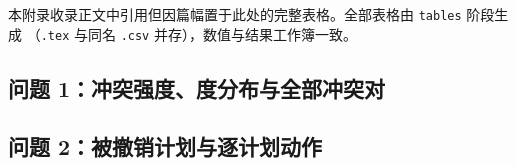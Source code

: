 本附录收录正文中引用但因篇幅置于此处的完整表格。全部表格由 \nolinkurl{tables} 阶段生成
（\nolinkurl{.tex} 与同名 \nolinkurl{.csv} 并存），数值与结果工作簿一致。

\subsection{问题 1：冲突强度、度分布与全部冲突对}

\begin{table}[H]
\centering\small
\begin{minipage}[t]{0.46\linewidth}
\centering
\caption{冲突强度分布：横跨 $k$ 对使用次的冲突对数量。多数冲突对只在一次使用上相撞。}\label{tab:q1mult}

\end{minipage}\hfill
\begin{minipage}[t]{0.46\linewidth}
\centering
\caption{冲突图中度最大的 $10$ 个用频装备。}\label{tab:q1deg}

\end{minipage}
\end{table}


\label{tab:q1conflicts}
{\footnotesize}
\addtocounter{table}{-1}%

\subsection{问题 2：被撤销计划与逐计划动作}

\begin{table}[H]
\centering\small
\caption{问题 2 中被撤销计划的局部环境。“冲突邻居数”为该计划在冲突图中的度，
“其中 A/B 类”为这些邻居中高优先级装备的个数，“可用平移动作数”为式~\eqref{eq:options} 中该计划的合法平移动作数。
多数被撤销的计划被高优先级邻居包围；表中也有邻居数仅为 $1$ 的计划，说明原始度数不是撤销的直接原因，
真正起作用的是最后一列——没有任何一个合法单参数动作能使它与存留计划都不冲突。}
\label{tab:q2cancel}
\resizebox{\linewidth}{!}{}
\end{table}

\label{tab:q2adj}
{\footnotesize}
\addtocounter{table}{-1}%

